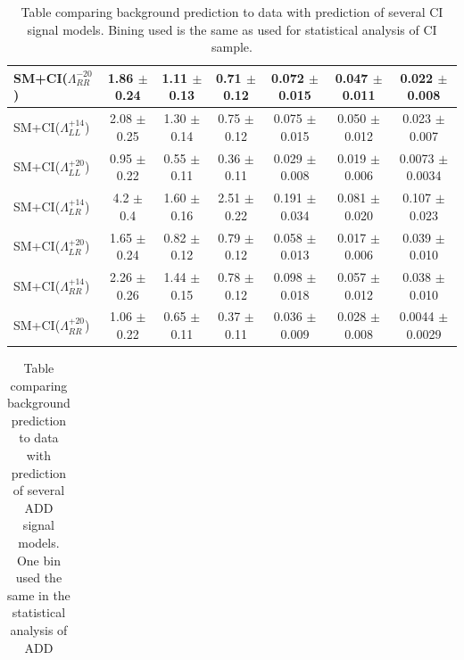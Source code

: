 \begin {table}[h]
\begin{center}
\begin{tabular}{  l | c c c | c c c  }
			SM+CI($\Lambda^{-20}_{RR}$) & 1.86 $\pm$ 0.24 & 1.11 $\pm$ 0.13 & 0.71 $\pm$ 0.12 & 0.072 $\pm$ 0.015 & 0.047 $\pm$ 0.011 & 0.022 $\pm$ 0.008 \\
			\hline
			SM+CI($\Lambda^{+14}_{LL}$) & 2.08 $\pm$ 0.25 & 1.30 $\pm$ 0.14 & 0.75 $\pm$ 0.12 & 0.075 $\pm$ 0.015 & 0.050 $\pm$ 0.012 & 0.023 $\pm$ 0.007 \\
			SM+CI($\Lambda^{+20}_{LL}$) & 0.95 $\pm$ 0.22 & 0.55 $\pm$ 0.11 & 0.36 $\pm$ 0.11 & 0.029 $\pm$ 0.008 & 0.019 $\pm$ 0.006 & 0.0073 $\pm$ 0.0034 \\
			SM+CI($\Lambda^{+14}_{LR}$) & 4.2 $\pm$ 0.4 & 1.60 $\pm$ 0.16 & 2.51 $\pm$ 0.22 & 0.191 $\pm$ 0.034 & 0.081 $\pm$ 0.020 & 0.107 $\pm$ 0.023 \\
			SM+CI($\Lambda^{+20}_{LR}$) & 1.65 $\pm$ 0.24 & 0.82 $\pm$ 0.12 & 0.79 $\pm$ 0.12 & 0.058 $\pm$ 0.013 & 0.017 $\pm$ 0.006 & 0.039 $\pm$ 0.010 \\
			SM+CI($\Lambda^{+14}_{RR}$) & 2.26 $\pm$ 0.26 & 1.44 $\pm$ 0.15 & 0.78 $\pm$ 0.12 & 0.098 $\pm$ 0.018 & 0.057 $\pm$ 0.012 & 0.038 $\pm$ 0.010 \\
			SM+CI($\Lambda^{+20}_{RR}$) & 1.06 $\pm$ 0.22 & 0.65 $\pm$ 0.11 & 0.37 $\pm$ 0.11 & 0.036 $\pm$ 0.009 & 0.028 $\pm$ 0.008 & 0.0044 $\pm$ 0.0029 \\
			\hline
	    	\hline
	  	\end{tabular}
	  	\caption{Table comparing background prediction to data with prediction of several CI signal models. Bining used is the same as used for statistical analysis of CI sample.}
	  	\label{tab:CI_results3}
	  	\end{center}
	\end {table}






	\begin {table}[h]
		\begin{center}
		\begin{tabular}{ | l | c | c | c | } 
			\hline
			
	    	\hline
	  	\end{tabular}
	  	\label{tab:ADD_results}
	  	\caption{Table comparing background prediction to data with prediction of several ADD signal models. One bin used the same in the statistical analysis of ADD}
	  	\end{center}
	\end {table}














